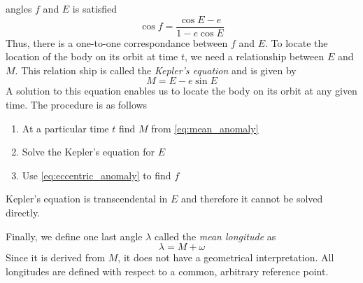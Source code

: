 angles $f$ and $E$ is satisfied
\begin{equation}
    \cos f= \frac{\cos E -e}{1-e\cos E} 
    \label{eq:eccentric_anomaly}
\end{equation}
Thus, there is a one-to-one correspondance between $f$ and $E$. To 
locate the location of the body on its orbit at time $t$, we need
a relationship between $E$ and $M$. This relation ship is called
the \emph{Kepler's equation} and is given by \citep{murray}
\begin{equation}
    M=E-e\sin E
    \label{eq:kepler_equation}
\end{equation}
A solution to this equation enables us to locate the body on its orbit
at any given time. The procedure is as follows
\begin{enumerate}
    \item At a particular time $t$ find $M$ from \cref{eq:mean_anomaly}
    \item Solve the Kepler's equation for $E$
    \item Use \cref{eq:eccentric_anomaly} to find $f$
\end{enumerate}
Kepler's equation is transcendental in $E$ and therefore it cannot
be solved directly. 

Finally, we define one last angle $\lambda$ called the
\emph{mean longitude} as
\begin{equation}
    \lambda =M +\omega
\end{equation}
Since it is derived from $M$, it does not have a geometrical 
interpretation. All longitudes are defined with respect to a 
common, arbitrary reference point.

